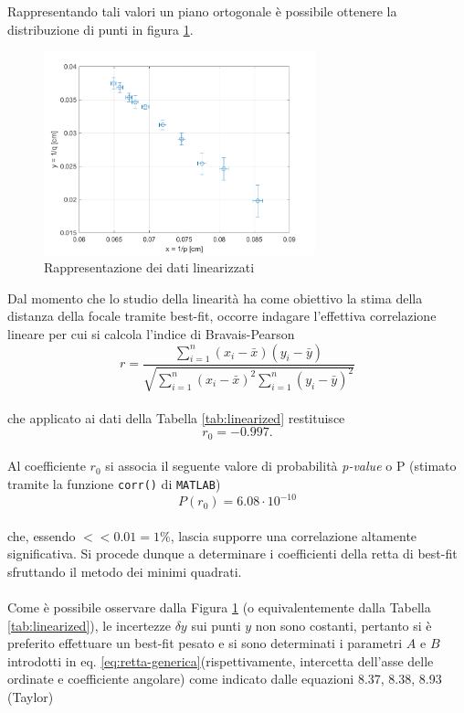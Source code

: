 \documentclass[11pt,a4paper]{article}
\begin{document}
Rappresentando tali valori un piano ortogonale è possibile ottenere la distribuzione di punti in figura  \ref{fig:linearized}.
\\
\begin{figure}[H]
    \centering
    \includegraphics[width=0.7\textwidth]{scatter_linearized.png}
    \caption{Rappresentazione dei dati linearizzati}
    \label{fig:linearized}
\end{figure}

Dal momento che lo studio della linearità ha come obiettivo la stima della distanza della focale tramite best-fit, occorre indagare l'effettiva correlazione lineare per cui si calcola l'indice di Bravais-Pearson
\\
\begin{equation}
    r=\frac{\sum_{i=1}^n\left(x_i-\bar{x}\right)\left(y_i-\bar{y}\right)}{\sqrt{\sum_{i=1}^n\left(x_i-\bar{x}\right)^2 \sum_{i=1}^n\left(y_i-\bar{y}\right)^2}}
\end{equation}
\\
che applicato ai dati della Tabella \ref{tab:linearized} restituisce
\\
\begin{equation}
    r_0 = -0.997.
\end{equation}
\\
Al coefficiente $r_0$ si associa il seguente valore di probabilità \textit{p-value} o P (stimato tramite la funzione \texttt{corr()} di \texttt{MATLAB})
\\
\begin{equation}
    P(r_0) = 6.08 \cdot 10^{-10}
\end{equation}
\\
che, essendo $<< 0.01 = 1 \%$, lascia supporre una correlazione altamente significativa. Si procede dunque a determinare i coefficienti della retta di best-fit sfruttando il metodo dei minimi quadrati.
\\
\\
Come è possibile osservare dalla Figura \ref{fig:linearized} (o equivalentemente dalla Tabella \ref{tab:linearized}), le incertezze $\delta y$ sui punti $y$ non sono costanti, pertanto si è preferito effettuare un best-fit pesato e si sono determinati i parametri $A$ e $B$ introdotti in eq. \ref{eq:retta-generica}(rispettivamente, intercetta dell'asse delle ordinate e coefficiente angolare) come indicato dalle equazioni 8.37, 8.38, 8.93 (Taylor)
\end{document}
